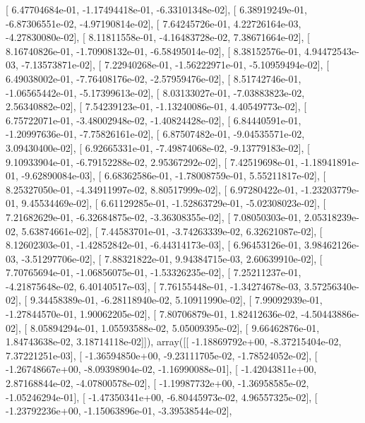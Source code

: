 \documentclass{article}
\begin{document}
       [  6.47704684e-01,  -1.17494418e-01,  -6.33101348e-02],
       [  6.38919249e-01,  -6.87306551e-02,  -4.97190814e-02],
       [  7.64245726e-01,   4.22726164e-03,  -4.27830080e-02],
       [  8.11811558e-01,  -4.16483728e-02,   7.38671664e-02],
       [  8.16740826e-01,  -1.70908132e-01,  -6.58495014e-02],
       [  8.38152576e-01,   4.94472543e-03,  -7.13573871e-02],
       [  7.22940268e-01,  -1.56222971e-01,  -5.10959494e-02],
       [  6.49038002e-01,  -7.76408176e-02,  -2.57959476e-02],
       [  8.51742746e-01,  -1.06565442e-01,  -5.17399613e-02],
       [  8.03133027e-01,  -7.03883823e-02,   2.56340882e-02],
       [  7.54239123e-01,  -1.13240086e-01,   4.40549773e-02],
       [  6.75722071e-01,  -3.48002948e-02,  -1.40824428e-02],
       [  6.84440591e-01,  -1.20997636e-01,  -7.75826161e-02],
       [  6.87507482e-01,  -9.04535571e-02,   3.09430400e-02],
       [  6.92665331e-01,  -7.49874068e-02,  -9.13779183e-02],
       [  9.10933904e-01,  -6.79152288e-02,   2.95367292e-02],
       [  7.42519698e-01,  -1.18941891e-01,  -9.62890084e-03],
       [  6.68362586e-01,  -1.78008759e-01,   5.55211817e-02],
       [  8.25327050e-01,  -4.34911997e-02,   8.80517999e-02],
       [  6.97280422e-01,  -1.23203779e-01,   9.45534469e-02],
       [  6.61129285e-01,  -1.52863729e-01,  -5.02308023e-02],
       [  7.21682629e-01,  -6.32684875e-02,  -3.36308355e-02],
       [  7.08050303e-01,   2.05318239e-02,   5.63874661e-02],
       [  7.44583701e-01,  -3.74263339e-02,   6.32621087e-02],
       [  8.12602303e-01,  -1.42852842e-01,  -6.44314173e-03],
       [  6.96453126e-01,   3.98462126e-03,  -3.51297706e-02],
       [  7.88321822e-01,   9.94384715e-03,   2.60639910e-02],
       [  7.70765694e-01,  -1.06856075e-01,  -1.53326235e-02],
       [  7.25211237e-01,  -4.21875648e-02,   6.40140517e-03],
       [  7.76155448e-01,  -1.34274678e-03,   3.57256340e-02],
       [  9.34458389e-01,  -6.28118940e-02,   5.10911990e-02],
       [  7.99092939e-01,  -1.27844570e-01,   1.90062205e-02],
       [  7.80706879e-01,   1.82412636e-02,  -4.50443886e-02],
       [  8.05894294e-01,   1.05593588e-02,   5.05009395e-02],
       [  9.66462876e-01,   1.84743638e-02,   3.18714118e-02]]), array([[ -1.18869792e+00,  -8.37215404e-02,   7.37221251e-03],
       [ -1.36594850e+00,  -9.23111705e-02,  -1.78524052e-02],
       [ -1.26748667e+00,  -8.09398904e-02,  -1.16990088e-01],
       [ -1.42043811e+00,   2.87168844e-02,  -4.07800578e-02],
       [ -1.19987732e+00,  -1.36958585e-02,  -1.05246294e-01],
       [ -1.47350341e+00,  -6.80445973e-02,   4.96557325e-02],
       [ -1.23792236e+00,  -1.15063896e-01,  -3.39538544e-02],
\end{document}
